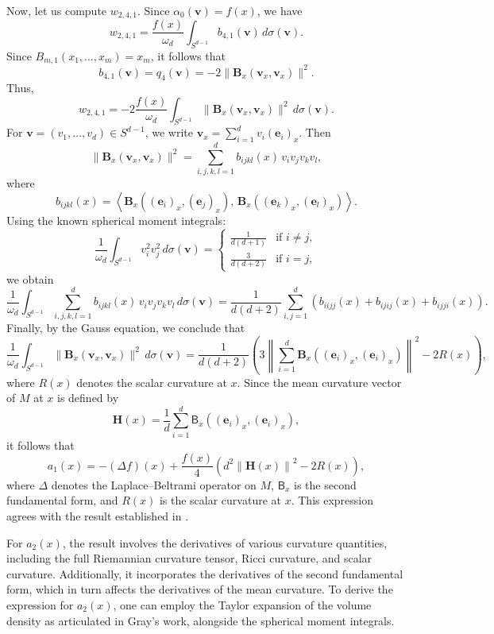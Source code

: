 \documentclass{amsart}
\theoremstyle{Theorem}
\theoremstyle{remark}
\numberwithin{equation}{section} \numberwithin{figure}{section}
\newcommand{\mf}[1]{\mathbf{#1}}
\begin{document}
Now, let us compute \( w_{2,4,1} \). Since \( \alpha_0(\mathbf{v}) = f(x) \), we have
\[
w_{2,4,1} = \frac{f(x)}{\omega_d} \int_{S^{d-1}} b_{4,1}(\mathbf{v}) \, d\sigma(\mathbf{v}).
\]
Since \( B_{m,1}(x_1, \dots, x_m) = x_m \), it follows that
\[
b_{4,1}(\mathbf{v}) = q_4(\mathbf{v}) = -2 \|\mf B_x(\mathbf{v}_x, \mathbf{v}_x) \|^2.
\]
Thus,
\[
w_{2,4,1} = -2 \frac{f(x)}{\omega_d} \int_{S^{d-1}} \|\mf B_x(\mathbf{v}_x, \mathbf{v}_x) \|^2 \, d\sigma(\mathbf{v}).
\]
For \( \mathbf{v} = (v_1, \dots, v_d) \in S^{d-1} \), we write \( \mathbf{v}_x = \sum_{i=1}^d v_i (\mathbf{e}_i)_x \). Then
\[
\|\mf B_x(\mathbf{v}_x, \mathbf{v}_x) \|^2 = \sum_{i,j,k,l=1}^d b_{ijkl}(x) \, v_i v_j v_k v_l,
\]
where
\[
b_{ijkl}(x) = \left\langle \mf B_x((\mathbf{e}_i)_x, (\mathbf{e}_j)_x), \,\mf B_x((\mathbf{e}_k)_x, (\mathbf{e}_l)_x) \right\rangle.
\]
Using the known spherical moment integrals:
\[
\frac{1}{\omega_d} \int_{S^{d-1}} v_i^2 v_j^2 \, d\sigma(\mathbf{v}) =
\begin{cases}
\frac{1}{d(d+1)} & \text{if } i \ne j, \\
\frac{3}{d(d+2)} & \text{if } i = j,
\end{cases}
\]
we obtain
\[
\frac{1}{\omega_d} \int_{S^{d-1}} \sum_{i,j,k,l=1}^d b_{ijkl}(x) \, v_i v_j v_k v_l \, d\sigma(\mathbf{v})
= \frac{1}{d(d+2)} \sum_{i,j=1}^d \left( b_{iijj}(x) + b_{ijij}(x) + b_{ijji}(x) \right).
\]
Finally, by the Gauss equation, we conclude that
\[
\frac{1}{\omega_d} \int_{S^{d-1}} \|\mf B_x(\mathbf{v}_x, \mathbf{v}_x) \|^2 \, d\sigma(\mathbf{v})
= \frac{1}{d(d+2)} \left( 3 \left\| \sum_{i=1}^d\mf B_x((\mathbf{e}_i)_x, (\mathbf{e}_i)_x) \right\|^2 - 2 R(x) \right),
\]
where \( R(x) \) denotes the scalar curvature at \( x \).  Since the mean curvature vector of \( M \) at \( x \) is defined by
\[
\mathbf{H}(x) = \frac{1}{d} \sum_{i=1}^d \mathsf{B}_x((\mathbf{e}_i)_x, (\mathbf{e}_i)_x),
\]
it follows that
\[
a_1(x) = -(\Delta f)(x) + \frac{f(x)}{4} \left( d^2 \left\| \mathbf{H}(x) \right\|^2 - 2 R(x) \right),
\]
where \( \Delta \) denotes the Laplace–Beltrami operator on \( M \), \( \mathsf{B}_x \) is the second fundamental form, and \( R(x) \) is the scalar curvature at \( x \). This expression agrees with the result established in \cite{HAL}.


For \( a_2(x) \), the result involves the derivatives of various curvature quantities, including the full Riemannian curvature tensor, Ricci curvature, and scalar curvature. Additionally, it incorporates the derivatives of the second fundamental form, which in turn affects the derivatives of the mean curvature. To derive the expression for \( a_2(x) \), one can employ the Taylor expansion of the volume density as articulated in Gray's work, alongside the spherical moment integrals.   
\end{document}

